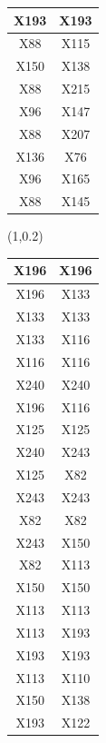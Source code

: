 \documentclass{beamer}
\newcommand{\boz}{\cellcolor{pathwaynode}}
\newcommand{\ghool}{\cellcolor{independentnode}}
\begin{document}
\begin{frame}[plain]
\begin{textblock*}{\paperwidth}
\begin{tabular}{| c c |}
\boz X193   &  \boz X193  \\ \hline
\ghool X88   &  X115  \\ \hline
\boz X150   &  X138  \\ \hline
\ghool X88   &  X215  \\ \hline
\ghool X96   &  X147  \\ \hline
\ghool X88   &  X207  \\ \hline
\ghool X136   &  X76  \\ \hline
\ghool X96   &  X165  \\ \hline
\ghool X88   &  X145  \\ \hline
    \end{tabular}
    \hspace{.5em}
  \end{textblock*}
  \begin{textblock*}{\paperwidth}(1\textwidth,0.2\textheight)
    \raggedright 
    \tiny
    \begin{tabular}{| c c |}
      \hline
\boz X196   &  \boz X196  \\ \hline
\boz X196   &  \boz X133  \\ \hline
\boz X133   &  \boz X133  \\ \hline
\boz X133   &  \boz X116  \\ \hline
\boz X116   &  \boz X116  \\ \hline
\boz X240   &  \boz X240  \\ \hline
\boz X196   &  \boz X116  \\ \hline
\boz X125   &  \boz X125  \\ \hline
\boz X240   &  \boz X243  \\ \hline
\boz X125   &  \boz X82  \\ \hline
\boz X243   &  \boz X243  \\ \hline
\boz X82   &  \boz X82  \\ \hline
\boz X243   &  \boz X150  \\ \hline
\boz X82   &  \boz X113  \\ \hline
\boz X150   &  \boz X150  \\ \hline
\boz X113   &  \boz X113  \\ \hline
\boz X113   &  \boz X193  \\ \hline
\boz X193   &  \boz X193  \\ \hline
\boz X113   &  X110  \\ \hline
\boz X150   &  X138  \\ \hline
\boz X193   &  X122  \\ \hline

\end{tabular}
\end{textblock*}
\end{frame}
\end{document}
